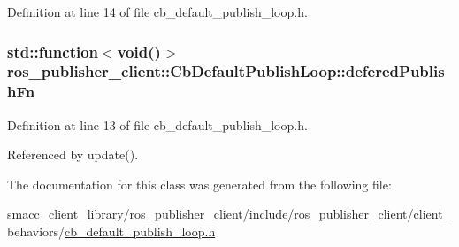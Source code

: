 Definition at line 14 of file cb\+\_\+default\+\_\+publish\+\_\+loop.\+h.

\subsubsection[{\texorpdfstring{defered\+Publish\+Fn}{deferedPublishFn}}]{\setlength{\rightskip}{0pt plus 5cm}std\+::function$<$void()$>$ ros\+\_\+publisher\+\_\+client\+::\+Cb\+Default\+Publish\+Loop\+::defered\+Publish\+Fn\hspace{0.3cm}{\ttfamily [private]}}\hypertarget{classros__publisher__client_1_1CbDefaultPublishLoop_a321f79f015449668a184cd30b6c2ad51}{}\label{classros__publisher__client_1_1CbDefaultPublishLoop_a321f79f015449668a184cd30b6c2ad51}


Definition at line 13 of file cb\+\_\+default\+\_\+publish\+\_\+loop.\+h.



Referenced by update().



The documentation for this class was generated from the following file\+:\begin{DoxyCompactItemize}
\item 
smacc\+\_\+client\+\_\+library/ros\+\_\+publisher\+\_\+client/include/ros\+\_\+publisher\+\_\+client/client\+\_\+behaviors/\hyperlink{cb__default__publish__loop_8h}{cb\+\_\+default\+\_\+publish\+\_\+loop.\+h}\end{DoxyCompactItemize}
